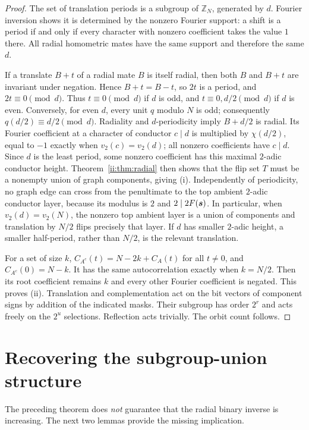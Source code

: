 \begin{proof}
The set of translation periods is a subgroup of $\mathbb Z_N$, generated by $d$.  Fourier inversion shows it is determined by the nonzero Fourier support: a shift is a period if and only if every character with nonzero coefficient takes the value $1$ there.  All radial homometric mates have the same support and therefore the same $d$.

If a translate $B+t$ of a radial mate $B$ is itself radial, then both $B$ and $B+t$ are invariant under negation.  Hence $B+t=B-t$, so $2t$ is a period, and $2t\equiv0\pmod d$.  Thus $t\equiv0\pmod d$ if $d$ is odd, and $t\equiv0,d/2\pmod d$ if $d$ is even.  Conversely, for even $d$, every unit $q$ modulo $N$ is odd; consequently $q(d/2)\equiv d/2\pmod d$.  Radiality and $d$-periodicity imply $B+d/2$ is radial.  Its Fourier coefficient at a character of conductor $c\mid d$ is multiplied by $\chi(d/2)$, equal to $-1$ exactly when $v_2(c)=v_2(d)$; all nonzero coefficients have $c\mid d$.  Since $d$ is the least period, some nonzero coefficient has this maximal $2$-adic conductor height.  Theorem~\ref{ii:thm:radial} then shows that the flip set $T$ must be a nonempty union of graph components, giving (i).  Independently of periodicity, no graph edge can cross from the penultimate to the top ambient $2$-adic conductor layer, because its modulus is $2$ and $2\mid2F(\boldsymbol{s})$.  In particular, when $v_2(d)=v_2(N)$, the nonzero top ambient layer is a union of components and translation by $N/2$ flips precisely that layer.  If $d$ has smaller $2$-adic height, a smaller half-period, rather than $N/2$, is the relevant translation.

For a set of size $k$, $C_{A^c}(t)=N-2k+C_A(t)$ for all $t\ne0$, and $C_{A^c}(0)=N-k$.  It has the same autocorrelation exactly when $k=N/2$.  Then its root coefficient remains $k$ and every other Fourier coefficient is negated.  This proves (ii).  Translation and complementation act on the bit vectors of component signs by addition of the indicated masks.  Their subgroup has order $2^r$ and acts freely on the $2^u$ selections.  Reflection acts trivially.  The orbit count follows.
\end{proof}

\section{Recovering the subgroup-union structure}
The preceding theorem does \emph{not} guarantee that the radial binary inverse is increasing.  The next two lemmas provide the missing implication.

